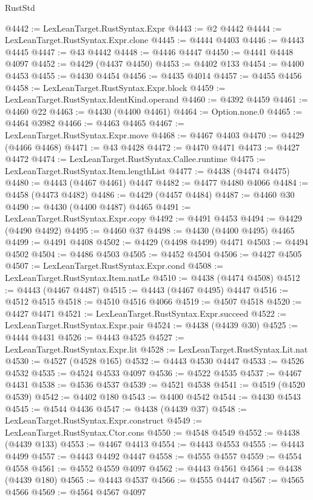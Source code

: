 \begin{lexlean}{RustStd}
\begin{coremodule}
{\begin{coremodule}
{{{{{{{{{{{{{{{{{{{{{{{{{{{{{{{{{{{{{{{{{{{{{{{{{{{{{{{{{{{{{{{{{{{{@4442 := LexLeanTarget.RustSyntax.Expr
@4443 := @2 @4442
@4444 := LexLeanTarget.RustSyntax.Expr.clone
@4445 := @4444 @4403
@4446 := @4443 @4445
@4447 := @43 @4442
@4448 := @4446 @4447
@4450 := @4441 @4448 @4097
@4452 := @4429 (@4437 @4450)
@4453 := @4402 @133
@4454 := @4400 @4453
@4455 := @4430 @4454
@4456 := @4435 @4014
@4457 := @4455 @4456
@4458 := LexLeanTarget.RustSyntax.Expr.block
@4459 := LexLeanTarget.RustSyntax.IdentKind.operand
@4460 := @4392 @4459
@4461 := @4460 @22
@4463 := @4430 (@4400 @4461)
@4464 := Option.none.{0}
@4465 := @4464 @3982
@4466 := @4463 @4465
@4467 := LexLeanTarget.RustSyntax.Expr.move
@4468 := @4467 @4403
@4470 := @4429 (@4466 @4468)
@4471 := @43 @4428
@4472 := @4470 @4471
@4473 := @4427 @4472
@4474 := LexLeanTarget.RustSyntax.Callee.runtime
@4475 := LexLeanTarget.RustSyntax.Item.lengthList
@4477 := @4438 (@4474 @4475)
@4480 := @4443 (@4467 @4461) @4447
@4482 := @4477 @4480 @4066
@4484 := @4458 (@4473 @4482)
@4486 := @4429 (@4457 @4484)
@4487 := @4460 @30
@4490 := @4430 (@4400 @4487) @4465
@4491 := LexLeanTarget.RustSyntax.Expr.copy
@4492 := @4491 @4453
@4494 := @4429 (@4490 @4492)
@4495 := @4460 @37
@4498 := @4430 (@4400 @4495) @4465
@4499 := @4491 @4408
@4502 := @4429 (@4498 @4499) @4471
@4503 := @4494 @4502
@4504 := @4486 @4503
@4505 := @4452 @4504
@4506 := @4427 @4505
@4507 := LexLeanTarget.RustSyntax.Expr.cond
@4508 := LexLeanTarget.RustSyntax.Item.natLe
@4510 := @4438 (@4474 @4508)
@4512 := @4443 (@4467 @4487)
@4515 := @4443 (@4467 @4495) @4447
@4516 := @4512 @4515
@4518 := @4510 @4516 @4066
@4519 := @4507 @4518
@4520 := @4427 @4471
@4521 := LexLeanTarget.RustSyntax.Expr.succeed
@4522 := LexLeanTarget.RustSyntax.Expr.pair
@4524 := @4438 (@4439 @30)
@4525 := @4444 @4431
@4526 := @4443 @4525
@4527 := LexLeanTarget.RustSyntax.Expr.lit
@4528 := LexLeanTarget.RustSyntax.Lit.nat
@4530 := @4527 (@4528 @165)
@4532 := @4443 @4530 @4447
@4533 := @4526 @4532
@4535 := @4524 @4533 @4097
@4536 := @4522 @4535
@4537 := @4467 @4431
@4538 := @4536 @4537
@4539 := @4521 @4538
@4541 := @4519 (@4520 @4539)
@4542 := @4402 @180
@4543 := @4400 @4542
@4544 := @4430 @4543
@4545 := @4544 @4436
@4547 := @4438 (@4439 @37)
@4548 := LexLeanTarget.RustSyntax.Expr.construct
@4549 := LexLeanTarget.RustSyntax.Ctor.cons
@4550 := @4548 @4549
@4552 := @4438 (@4439 @133)
@4553 := @4467 @4413
@4554 := @4443 @4553
@4555 := @4443 @4499
@4557 := @4443 @4492 @4447
@4558 := @4555 @4557
@4559 := @4554 @4558
@4561 := @4552 @4559 @4097
@4562 := @4443 @4561
@4564 := @4438 (@4439 @180)
@4565 := @4443 @4537
@4566 := @4555 @4447
@4567 := @4565 @4566
@4569 := @4564 @4567 @4097
}}}}}}}}}}}}}}}}}}}}}}}}}}}}}}}}}}}}}}}}}}}}}}}}}}}}}}}}}}}}}}}}}}}}
\end{coremodule}}
\end{coremodule}
\end{lexlean}
